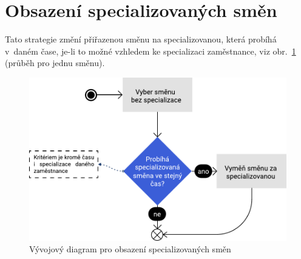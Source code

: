 \documentclass[twoside]{ctuthesis}
\begin{document}
\section{Obsazení specializovaných směn}
Tato strategie změní přiřazenou směnu na specializovanou, která probíhá v~daném čase, je-li to možné vzhledem ke specializaci zaměstnance, viz obr.~\ref{fig:specialize} (průběh pro jednu směnu).

\begin{figure}
	\includegraphics[scale=0.7]{img/specialize.pdf}
	\caption{Vývojový diagram pro obsazení specializovaných směn}
	\label{fig:specialize}
\end{figure}

%
\end{document}
